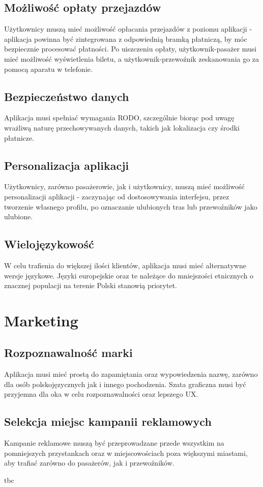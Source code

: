 \subsection{Możliwość opłaty przejazdów}
Użytkownicy muszą mieć możliwość opłacania przejazdów z poziomu aplikacji - aplikacja powinna być zintegrowana z odpowiednią bramką płatniczą, by móc bezpiecznie procesować płatności. Po uiszczeniu opłaty, użytkownik-pasażer musi mieć możliwość wyświetlenia biletu, a użytkownik-przewoźnik zeskanowania go za pomocą aparatu w telefonie.

\subsection{Bezpieczeństwo danych}
Aplikacja musi spełniać wymagania RODO, szczególnie biorąc pod uwagę wrażliwą naturę przechowywanych danych, takich jak lokalizacja czy środki płatnicze.

\subsection{Personalizacja aplikacji}
Użytkownicy, zarówno pasażerowie, jak i użytkownicy, muszą mieć możliwość personalizacji aplikacji - zaczynając od dostosowywania interfejsu, przez tworzenie własnego profilu, po oznaczanie ulubionych tras lub przewoźników jako ulubione.

\subsection{Wielojęzykowość}
W celu trafienia do większej ilości klientów, aplikacja musi mieć alternatywne wersje językowe. Języki europejskie oraz te należące do mniejszości etnicznych o znacznej populacji na terenie Polski stanowią priorytet.

\section{Marketing}
\subsection{Rozpoznawalność marki}
Aplikacja musi mieć prostą do zapamiętania oraz wypowiedzenia nazwę, zarówno dla osób polskojęzycznych jak i innego pochodzenia. Szata graficzna musi być przyjemna dla oka w celu rozpoznawalności oraz lepszego UX.

\subsection{Selekcja miejsc kampanii reklamowych}
Kampanie reklamowe muszą być przeprowadzane przede wszystkim na pomniejszych przystankach oraz w miejscowościach poza większymi miastami, aby trafiać zarówno do pasażerów, jak i przewoźników.

tbc